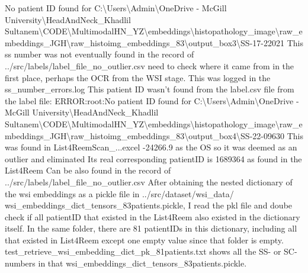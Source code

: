 \documentclass{article}%
\begin{document}
\newline%
\newline%
%
No patient ID found for C:\textbackslash{}Users\textbackslash{}Admin\textbackslash{}OneDrive {-} McGill University\textbackslash{}HeadAndNeck\_Khadlil Sultanem\textbackslash{}CODE\textbackslash{}MultimodalHN\_YZ\textbackslash{}embeddings\textbackslash{}histopathology\_image\textbackslash{}raw\_embeddings\_JGH\textbackslash{}raw\_histoimg\_embeddings\_83\textbackslash{}output\_box3\textbackslash{}SS{-}17{-}22021%
\newline%
\newline%
%
This ss number was not eventually found in the record of ../src/labels/label\_file\_no\_outlier.csv%
\newline%
\newline%
%
need to check where it came from in the first place, perhaps the OCR from the WSI stage. This was logged in the ss\_number\_errors.log%
\newline%
\newline%
%
This patient ID wasn’t found from the label.csv file from the label file: ERROR:root:No patient ID found for C:\textbackslash{}Users\textbackslash{}Admin\textbackslash{}OneDrive {-} McGill University\textbackslash{}HeadAndNeck\_Khadlil Sultanem\textbackslash{}CODE\textbackslash{}MultimodalHN\_YZ\textbackslash{}embeddings\textbackslash{}histopathology\_image\textbackslash{}raw\_embeddings\_JGH\textbackslash{}raw\_histoimg\_embeddings\_83\textbackslash{}output\_box4\textbackslash{}SS{-}22{-}09630%
\newline%
\newline%
%
This was found in List4ReemScan\_...excel %
\newline%
\newline%
%
{-}24266.9 as the OS so it was deemed as an outlier and eliminated %
\newline%
\newline%
%
Its real corresponding patientID is 1689364 as found in the List4Reem %
\newline%
\newline%
%
Can be also found in the record of ../src/labels/label\_file\_no\_outlier.csv%
\newline%
\newline%
%
After obtaining the nested dictionary of the wsi embeddings as a pickle file in ../src/dataset/wsi\_data/ wsi\_embeddings\_dict\_tensors\_83patients.pickle, I read the pkl file and doube check if all patientID that existed in the List4Reem also existed in the dictionary itself. In the same folder, there are 81 patientIDs in this dictionary, including all that existed in List4Reem except one empty value since that folder is empty. test\_retrieve\_wsi\_embedding\_dict\_pk\_81patients.txt shows all the SS{-} or SC{-} numbers in that wsi\_embeddings\_dict\_tensors\_83patients.pickle. %
\end{document}
